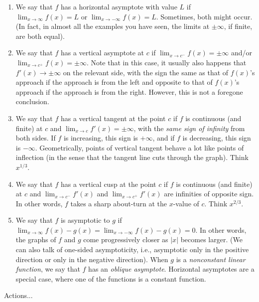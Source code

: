 \documentclass[10pt]{amsart}
\begin{document}
\begin{enumerate}

\item We say that $f$ has a horizontal asymptote with value $L$ if
  $\lim_{x \to \infty} f(x) = L$ or $\lim_{x \to -\infty} f(x) =
  L$. Sometimes, both might occur. (In fact, in almost all the
  examples you have seen, the limits at $\pm \infty$, if finite, are
  both equal).
\item We say that $f$ has a vertical asymptote at $c$ if $\lim_{x \to
  c^-} f(x) = \pm \infty$ and/or $\lim_{x \to c^+} f(x) = \pm
  \infty$. Note that in this case, it usually also happens that $f'(x)
  \to \pm \infty$ on the relevant side, with the sign the same as that
  of $f(x)$'s approach if the approach is from the left and opposite
  to that of $f(x)$'s approach if the approach is from the
  right. However, this is not a foregone conclusion.
\item We say that $f$ has a vertical tangent at the point $c$ if $f$
  is continuous (and finite) at $c$ and $\lim_{x \to c} f'(x) =
  \pm \infty$, with the {\em same sign of infinity} from both sides. If
  $f$ is increasing, this sign is $+\infty$, and if $f$ is decreasing,
  this sign is $-\infty$. Geometrically, points of vertical tangent
  behave a lot like points of inflection (in the sense that the
  tangent line cuts through the graph). Think $x^{1/3}$.
\item We say that $f$ has a vertical cusp at the point $c$ if $f$ is
  continuous (and finite) at $c$ and $\lim_{x \to c^-} f'(x)$ and
  $\lim_{x \to c^+} f'(x)$ are infinities of opposite sign. In other
  words, $f$ takes a sharp about-turn at the $x$-value of $c$. Think
  $x^{2/3}$.
\item We say that $f$ is asymptotic to $g$ if $\lim_{x \to \infty}
  f(x) - g(x) = \lim_{x \to -\infty} f(x) - g(x) = 0$. In other words,
  the graphs of $f$ and $g$ come progressively closer as $|x|$ becomes
  larger. (We can also talk of one-sided asymptoticity, i.e.,
  asymptotic only in the positive direction or only in the negative
  direction). When $g$ is a {\em nonconstant linear function}, we say
  that $f$ has an {\em oblique asymptote}. Horizontal asymptotes are a
  special case, where one of the functions is a constant function.
\end{enumerate}

Actions...
\end{document}
